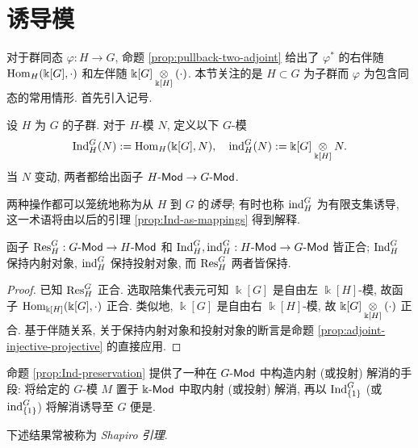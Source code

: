 \section{诱导模}\label{sec:induced-module}
对于群同态 $\varphi: H \to G$, 命题 \ref{prop:pullback-two-adjoint} 给出了 $\varphi^*$ 的右伴随 $\operatorname{Hom}_H(\Bbbk[G], \cdot)$ 和左伴随 $\Bbbk[G] \underset{\Bbbk[H]}{\otimes} (\cdot)$. 本节关注的是 $H \subset G$ 为子群而 $\varphi$ 为包含同态的常用情形. 首先引入记号.

\begin{definition}[诱导模]\label{def:induced-module}
	设 $H$ 为 $G$ 的子群. 对于 $H$-模 $N$, 定义以下 $G$-模
	\[ \operatorname{Ind}^G_H(N) := \operatorname{Hom}_H(\Bbbk[G], N), \quad \operatorname{ind}^G_H(N) := \Bbbk[G] \underset{\Bbbk[H]}{\otimes} N. \]
	当 $N$ 变动, 两者都给出函子 $H\text{-}\mathsf{Mod} \to G\text{-}\mathsf{Mod}$.
\end{definition}

两种操作都可以笼统地称为从 $H$ 到 $G$ 的\emph{诱导}; 有时也称 $\operatorname{ind}^G_H$ 为有限支集诱导, 这一术语将由以后的引理 \ref{prop:Ind-as-mappings} 得到解释.

\begin{proposition}\label{prop:Ind-preservation}
	函子 $\operatorname{Res}^G_H: G\text{-}\mathsf{Mod} \to H\text{-}\mathsf{Mod}$ 和 $\operatorname{Ind}^G_H, \operatorname{ind}^G_H: H\text{-}\mathsf{Mod} \to G\text{-}\mathsf{Mod}$ 皆正合; $\operatorname{Ind}^G_H$ 保持内射对象, $\operatorname{ind}^G_H$ 保持投射对象, 而 $\operatorname{Res}^G_H$ 两者皆保持.
\end{proposition}
\begin{proof}
	已知 $\operatorname{Res}^G_H$ 正合. 选取陪集代表元可知 $\Bbbk[G]$ 是自由左 $\Bbbk[H]$-模, 故函子 $\operatorname{Hom}_{\Bbbk[H]}(\Bbbk[G], \cdot)$ 正合. 类似地, $\Bbbk[G]$ 是自由右 $\Bbbk[H]$-模, 故 $\Bbbk[G] \underset{\Bbbk[H]}{\otimes} (\cdot)$ 正合. 基于伴随关系, 关于保持内射对象和投射对象的断言是命题 \ref{prop:adjoint-injective-projective} 的直接应用.
\end{proof}

命题 \ref{prop:Ind-preservation} 提供了一种在 $G\text{-}\mathsf{Mod}$ 中构造内射 (或投射) 解消的手段: 将给定的 $G$-模 $M$ 置于 $\Bbbk\text{-}\mathsf{Mod}$ 中取内射 (或投射) 解消, 再以 $\operatorname{Ind}^G_{\{1\}}$ (或 $\operatorname{ind}^G_{\{1\}}$) 将解消诱导至 $G$ 便是.

下述结果常被称为 \emph{Shapiro 引理}.

